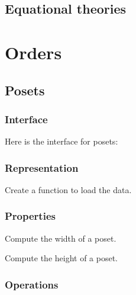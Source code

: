 \section{Equational theories}



\chapter{Orders}


\section{Posets}

\subsection*{Interface}

Here is the interface for posets:

%

\subsection*{Representation}


\begin{exercise}[Representation]
  Create a function to load the data.


%

\end{exercise}

\subsection{Properties}


\begin{exercise}
  Compute the width of a poset.
\end{exercise}

\begin{exercise}
  Compute the height of a poset.
\end{exercise}

\subsection{Operations}


